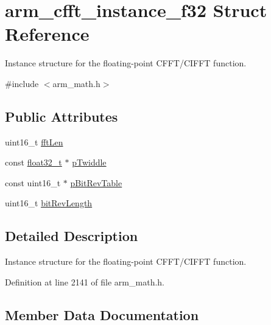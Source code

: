 \hypertarget{structarm__cfft__instance__f32}{}\section{arm\+\_\+cfft\+\_\+instance\+\_\+f32 Struct Reference}
\label{structarm__cfft__instance__f32}


Instance structure for the floating-\/point C\+F\+F\+T/\+C\+I\+F\+FT function.  




{\ttfamily \#include $<$arm\+\_\+math.\+h$>$}

\subsection*{Public Attributes}
\begin{DoxyCompactItemize}
\item 
uint16\+\_\+t \hyperlink{structarm__cfft__instance__f32_acd8f9e9540e3dd348212726e5d6aaa95}{fft\+Len}
\item 
const \hyperlink{arm__math_8h_a4611b605e45ab401f02cab15c5e38715}{float32\+\_\+t} $\ast$ \hyperlink{structarm__cfft__instance__f32_a59cc6f753f1498716e1444ac054c06de}{p\+Twiddle}
\item 
const uint16\+\_\+t $\ast$ \hyperlink{structarm__cfft__instance__f32_a21ceaf59a1bb8440af57c28d2dd9bbab}{p\+Bit\+Rev\+Table}
\item 
uint16\+\_\+t \hyperlink{structarm__cfft__instance__f32_a3ba329ed153d182746376208e773d648}{bit\+Rev\+Length}
\end{DoxyCompactItemize}


\subsection{Detailed Description}
Instance structure for the floating-\/point C\+F\+F\+T/\+C\+I\+F\+FT function. 

Definition at line 2141 of file arm\+\_\+math.\+h.



\subsection{Member Data Documentation}
\mbox{\label{structarm__cfft__instance__f32_a3ba329ed153d182746376208e773d648}} 
